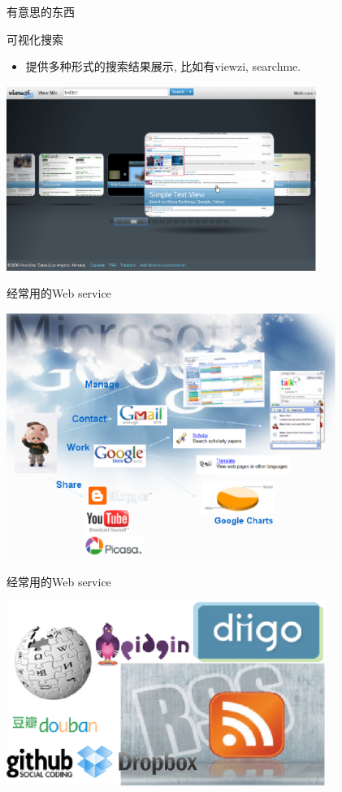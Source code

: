 \documentclass[dvipdfm]{beamer}
\begin{document}
\begin{frame}[t]{有意思的东西}
  \begin{block}{可视化搜索}
    \begin{itemize}
    \item 提供多种形式的搜索结果展示, 比如有viewzi, searchme.  \pause
    \end{itemize}
  \end{block}
  \begin{center}
  \centering \includegraphics[height=6cm]{figure/viewzi.eps}
  \end{center}
\end{frame}

\begin{frame}[t]{经常用的Web service}
  \begin{center}
  \centering \includegraphics[height=8cm]{figure/ws.eps}
  \end{center}
\end{frame}

\begin{frame}[t]{经常用的Web service}
  \vspace{1em}
  \begin{center}
  \includegraphics[height=6cm]{figure/ws2.eps}
  \end{center}
\end{frame}
\end{document}
